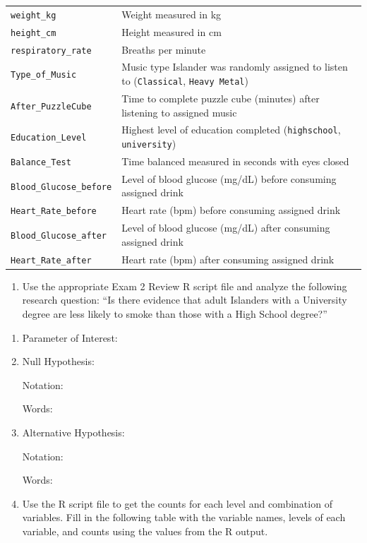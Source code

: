 \documentclass[
]{report}
\providecommand{\tightlist}{%
  \setlength{\itemsep}{0pt}\setlength{\parskip}{0pt}}
\begin{document}
\begin{longtable}[]{@{}
  >{\raggedright\arraybackslash}p{}
  >{\raggedright\arraybackslash}p{}@{}}
\texttt{weight\_kg} & Weight measured in kg \\
\texttt{height\_cm} & Height measured in cm \\
\texttt{respiratory\_rate} & Breaths per minute \\
\texttt{Type\_of\_Music} & Music type Islander was randomly assigned to listen to (\texttt{Classical}, \texttt{Heavy\ Metal}) \\
\texttt{After\_PuzzleCube} & Time to complete puzzle cube (minutes) after listening to assigned music \\
\texttt{Education\_Level} & Highest level of education completed (\texttt{highschool}, \texttt{university}) \\
\texttt{Balance\_Test} & Time balanced measured in seconds with eyes closed \\
\texttt{Blood\_Glucose\_before} & Level of blood glucose (mg/dL) before consuming assigned drink \\
\texttt{Heart\_Rate\_before} & Heart rate (bpm) before consuming assigned drink \\
\texttt{Blood\_Glucose\_after} & Level of blood glucose (mg/dL) after consuming assigned drink \\
\texttt{Heart\_Rate\_after} & Heart rate (bpm) after consuming assigned drink \\
\end{longtable}

\newpage

\begin{enumerate}
\def\labelenumi{\arabic{enumi}.}
\tightlist
\item
  Use the appropriate Exam 2 Review R script file and analyze the following research question: ``Is there evidence that adult Islanders with a University degree are less likely to smoke than those with a High School degree?''
\end{enumerate}

\begin{enumerate}
\def\labelenumi{\alph{enumi}.}
\item
  Parameter of Interest:
  \vspace{0.3in}
\item
  Null Hypothesis:

  Notation:
  \vspace{0.3in}

  Words:
  \vspace{0.5in}
\item
  Alternative Hypothesis:

  Notation:
  \vspace{0.3in}

  Words:
  \vspace{0.5in}
\item
  Use the R script file to get the counts for each level and combination of variables. Fill in the following table with the variable names, levels of each variable, and counts using the values from the R output.
\end{enumerate}
\end{document}
